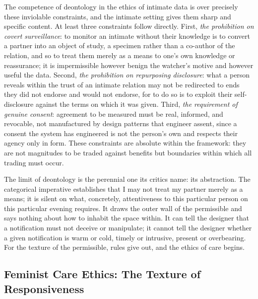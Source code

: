 \documentclass[11pt,a4paper]{article}
\begin{document}
The competence of deontology in the ethics of intimate data is over precisely these inviolable constraints, and the intimate setting gives them sharp and specific content. At least three constraints follow directly. First, \emph{the prohibition on covert surveillance}: to monitor an intimate without their knowledge is to convert a partner into an object of study, a specimen rather than a co-author of the relation, and so to treat them merely as a means to one's own knowledge or reassurance; it is impermissible however benign the watcher's motive and however useful the data. Second, \emph{the prohibition on repurposing disclosure}: what a person reveals within the trust of an intimate relation may not be redirected to ends they did not endorse and would not endorse, for to do so is to exploit their self-disclosure against the terms on which it was given. Third, \emph{the requirement of genuine consent}: agreement to be measured must be real, informed, and revocable, not manufactured by design patterns that engineer assent, since a consent the system has engineered is not the person's own and respects their agency only in form. These constraints are absolute within the framework: they are not magnitudes to be traded against benefits but boundaries within which all trading must occur.

The limit of deontology is the perennial one its critics name: its abstraction. The categorical imperative establishes that I may not treat my partner merely as a means; it is silent on what, concretely, attentiveness to this particular person on this particular evening requires. It draws the outer wall of the permissible and says nothing about how to inhabit the space within. It can tell the designer that a notification must not deceive or manipulate; it cannot tell the designer whether a given notification is warm or cold, timely or intrusive, present or overbearing. For the texture of the permissible, rules give out, and the ethics of care begins.

\subsection{Feminist Care Ethics: The Texture of Responsiveness}\label{p01:sec:care}
\end{document}
